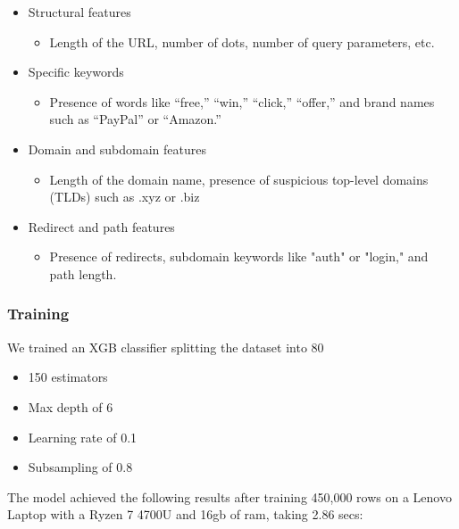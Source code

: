 \documentclass{article}
\begin{document}
\begin{itemize}
    \item Structural features
        \begin{itemize}
        \item Length of the URL, number of dots, number of query parameters, etc.
        \end{itemize}
    \item Specific keywords
        \begin{itemize}
        \item Presence of words like “free,” “win,” “click,” “offer,” and brand names such as “PayPal” or “Amazon.”
        \end{itemize}
    \item Domain and subdomain features
        \begin{itemize}
        \item Length of the domain name, presence of suspicious top-level domains (TLDs) such as .xyz or .biz
        \end{itemize}
    \item Redirect and path features
        \begin{itemize}
            \item Presence of redirects, subdomain keywords like "auth" or "login," and path length.
        \end{itemize}
\end{itemize}

\subsubsection*{Training}

We trained an XGB classifier splitting the dataset into 80%

\begin{itemize}
    \item 150 estimators
    \item Max depth of 6
    \item Learning rate of 0.1
    \item Subsampling of 0.8
\end{itemize}

The model achieved the following results after training 450,000 rows on a Lenovo Laptop with a Ryzen 7 4700U and 16gb of ram, taking 2.86 secs:
\end{document}

